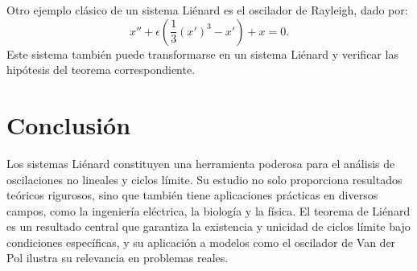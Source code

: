 Otro ejemplo clásico de un sistema Liénard es el oscilador de Rayleigh, dado por:
\[
x'' + \epsilon \left( \frac{1}{3} (x')^3 - x' \right) + x = 0.
\]
Este sistema también puede transformarse en un sistema Liénard y verificar las hipótesis del teorema correspondiente.

\section{Conclusión}

Los sistemas Liénard constituyen una herramienta poderosa para el análisis de oscilaciones no lineales y ciclos límite. Su estudio no solo proporciona resultados teóricos rigurosos, sino que también tiene aplicaciones prácticas en diversos campos, como la ingeniería eléctrica, la biología y la física. El teorema de Liénard es un resultado central que garantiza la existencia y unicidad de ciclos límite bajo condiciones específicas, y su aplicación a modelos como el oscilador de Van der Pol ilustra su relevancia en problemas reales.
